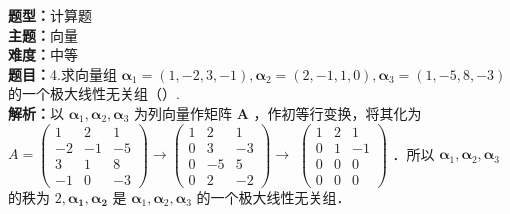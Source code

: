 \documentclass{ctexart}
\newenvironment{question}[5]{%
	\noindent\textbf{题型：}#1\\
	\textbf{主题：}#2\\
	\textbf{难度：}#3\\
	\textbf{题目：}#4\\
	\textbf{解析：}#5\\
	\vspace{1em}
}{}
\begin{document}
	\begin{question}
		{计算题}
		{向量}
		{中等}
		{4.求向量组 \(\boldsymbol{\alpha}_1=(1,-2,3,-1), \boldsymbol{\alpha}_2=(2,-1,1,0), \boldsymbol{\alpha}_3=(1,-5,8,-3)\) 的一个极大线性无关组（）. }
		{以 \(\boldsymbol{\alpha}_1, \boldsymbol{\alpha}_2, \boldsymbol{\alpha}_3\) 为列向量作矩阵 \(\mathbf{A}\) ，作初等行变换，将其化为
			\(A=\left(\begin{array}{lll}1 & 2 & 1 \\ -2 & -1 & -5 \\ 3 & 1 & 8 \\ -1 & 0 & -3\end{array}\right) \rightarrow\left(\begin{array}{lll}1 & 2 & 1 \\ 0 & 3 & -3 \\ 0 & -5 & 5 \\ 0 & 2 & -2\end{array}\right) \rightarrow\) \(\left(\begin{array}{lll}1 & 2 & 1 \\ 0 & 1 & -1 \\ 0 & 0 & 0 \\ 0 & 0 & 0\end{array}\right)\) ．所以 \(\boldsymbol{\alpha}_1, \boldsymbol{\alpha}_2, \boldsymbol{\alpha}_3\) 的秩为 \(2, \boldsymbol{\alpha}_{\mathbf{1}}, \boldsymbol{\alpha}_{\mathbf{2}}\) 是 \(\boldsymbol{\alpha}_1, \boldsymbol{\alpha}_2, \boldsymbol{\alpha}_3\) 的一个极大线性无关组．}
	\end{question}
	
\end{document}
